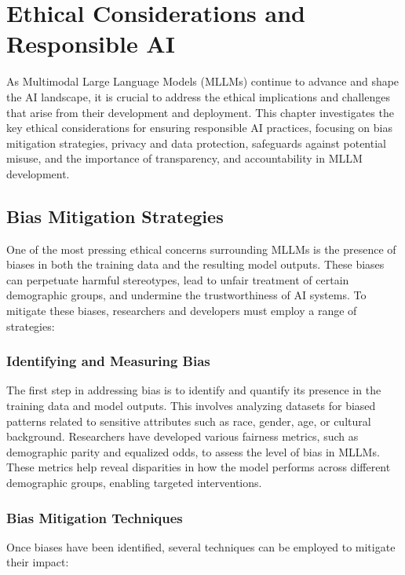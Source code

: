 
\chapter{Ethical Considerations and Responsible AI}

As Multimodal Large Language Models (MLLMs) continue to advance and shape the AI landscape, it is crucial to address the ethical implications and challenges that arise from their development and deployment. This chapter investigates the key ethical considerations for ensuring responsible AI practices, focusing on bias mitigation strategies, privacy and data protection, safeguards against potential misuse, and the importance of transparency, and accountability in MLLM development.

\section{Bias Mitigation Strategies}

One of the most pressing ethical concerns surrounding MLLMs is the presence of biases in both the training data and the resulting model outputs. These biases can perpetuate harmful stereotypes, lead to unfair treatment of certain demographic groups, and undermine the trustworthiness of AI systems. To mitigate these biases, researchers and developers must employ a range of strategies:

\subsection{Identifying and Measuring Bias}

The first step in addressing bias is to identify and quantify its presence in the training data and model outputs. This involves analyzing datasets for biased patterns related to sensitive attributes such as race, gender, age, or cultural background. Researchers have developed various fairness metrics, such as demographic parity and equalized odds, to assess the level of bias in MLLMs. These metrics help reveal disparities in how the model performs across different demographic groups, enabling targeted interventions.

\subsection{Bias Mitigation Techniques}

Once biases have been identified, several techniques can be employed to mitigate their impact:

